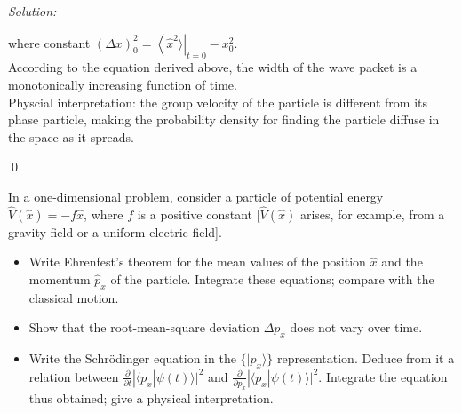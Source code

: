 \documentclass[12pt,a4paper]{article}
\newenvironment{problem}[2][Problem]{\begin{trivlist}
\item[\hskip \labelsep {\bfseries #1}\hskip \labelsep {\bfseries #2.}]}{\end{trivlist}}
\newenvironment{sol}
    {\emph{Solution:}
    }
    {
    \qed
    }
\begin{document}
\begin{sol}
\begin{itemize}
\begin{equation}
\end{equation}
where constant $(\Delta x)_0^2=\left\langle\hat{x}^2\rangle\right|_{t=0}-x_0^2$.\\
According to the equation derived above, the width of the wave packet is a monotonically increasing function of time.\\
Physcial interpretation: the group velocity of the particle is different from its phase particle, making the probability density for finding the particle diffuse in the space as it spreads.
\end{itemize}
\end{sol}

\begin{problem}{2}
[C-T Exercise 3-5] In a one-dimensional problem, consider a particle of potential energy $\hat{V}(\hat{x})=-f\hat{x}$, where $f$ is a positive constant [$\hat{V}(\hat{x})$ arises, for example, from a gravity field or a uniform electric field].
\begin{itemize}
\item[(a)] Write Ehrenfest's theorem for the mean values of the position $\hat{x}$ and the momentum $\hat{p}_x$ of the particle. Integrate these equations; compare with the classical motion.
\item[(b)] Show that the root-mean-square deviation $\Delta p_x$ does not vary over time.
\item[(c)] Write the Schrödinger equation in the $\{|p_x\rangle\}$ representation. Deduce from it a relation between $\frac{\partial}{\partial t}|\langle p_x|\psi(t)\rangle|^2$ and $\frac{\partial}{\partial p_x}|\langle p_x|\psi(t)\rangle|^2$. Integrate the equation thus obtained; give a physical interpretation.
\end{itemize}
\end{problem}
\end{document}
